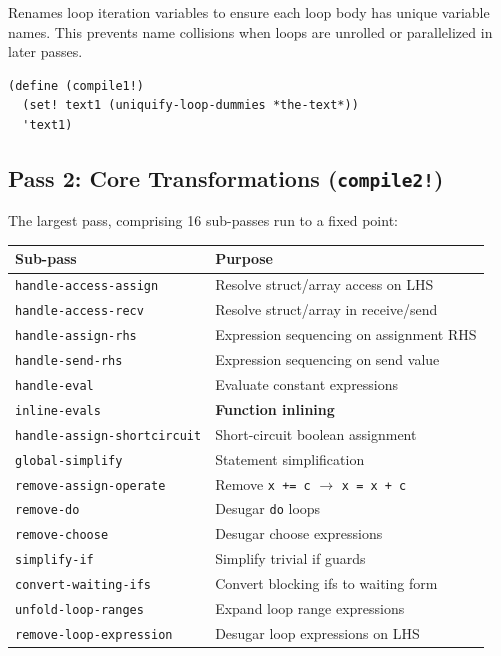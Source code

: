 \documentclass[11pt,letterpaper]{article}
\begin{document}
Renames loop iteration variables to ensure each loop body has unique
variable names.  This prevents name collisions when loops are unrolled
or parallelized in later passes.

\begin{lstlisting}
(define (compile1!)
  (set! text1 (uniquify-loop-dummies *the-text*))
  'text1)
\end{lstlisting}

\subsection{Pass 2: Core Transformations (\texttt{compile2!})}

The largest pass, comprising 16 sub-passes run to a fixed point:

\begin{center}
\begin{tabular}{ll}
\toprule
\textbf{Sub-pass} & \textbf{Purpose} \\
\midrule
\texttt{handle-access-assign} & Resolve struct/array access on LHS \\
\texttt{handle-access-recv} & Resolve struct/array in receive/send \\
\texttt{handle-assign-rhs} & Expression sequencing on assignment RHS \\
\texttt{handle-send-rhs} & Expression sequencing on send value \\
\texttt{handle-eval} & Evaluate constant expressions \\
\texttt{inline-evals} & \textbf{Function inlining} \\
\texttt{handle-assign-shortcircuit} & Short-circuit boolean assignment \\
\texttt{global-simplify} & Statement simplification \\
\texttt{remove-assign-operate} & Remove \texttt{x += c} $\to$ \texttt{x = x + c} \\
\texttt{remove-do} & Desugar \texttt{do} loops \\
\texttt{remove-choose} & Desugar choose expressions \\
\texttt{simplify-if} & Simplify trivial if guards \\
\texttt{convert-waiting-ifs} & Convert blocking ifs to waiting form \\
\texttt{unfold-loop-ranges} & Expand loop range expressions \\
\texttt{remove-loop-expression} & Desugar loop expressions on LHS \\
\bottomrule
\end{tabular}
\end{center}
\end{document}
